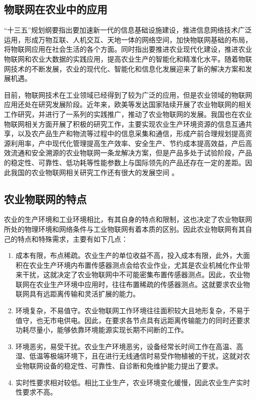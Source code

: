 	\subsection{物联网在农业中的应用}
“十三五”规划纲要指出要加速新一代的信息基础设施建设，推进信息网络技术广泛运用，形成万物互联、人机交互、天地一体的网络空间，加快物联网基础的布局，将物联网应用在社会生活的各个方面。同时指出要推进农业现代化建设，推进农业物联网和农业大数据的实践应用，提高农业生产的智能化和精准化水平。随着物联网技术的不断发展，农业的现代化、智能化和信息化发展迎来了新的解决方案和发展机遇。
	
目前，物联网技术在工业领域已经得到了较为广泛的应用，但是农业领域的物联网应用还处在研究发展阶段。近年来，欧美等发达国家陆续开展了农业物联网的相关工作研究，并进行了一系列的实践推广，推动了农业物联网的发展。我国也在农业物联网相关方面开展了积极的研究工作，主要实现农业生产环境资源的信息互通共享，以及农产品生产和物流等过程中的信息采集和通信，形成产前合理规划提高资源利用率，产中现代化管理提高生产效率、安全生产、节约成本提高效益，产后高效流通和安全溯源的农业物联网一条龙解决方案，但是产品多处于试验阶段，产品的稳定性、可靠性、低功耗等性能参数上与国际领先的产品还存在一定的差距。因此我国的农业物联网相关研究工作还有很大的发展空间\supercite{ChenWei2013} 。
	
	\subsection{农业物联网的特点}
农业的生产环境和工业环境相比，有其自身的特点和限制，这也决定了农业物联网所处的物理环境和网络条件与工业物联网有着本质的区别。因此农业物联网有其自己的特点和特殊需求，主要有如下几点：
	\begin{enumerate}
  			\item 成本有限，布点稀疏。农业生产的单位收益不高，投入成本有限，此外，大面积在农业生产环境内布置传感器测点会给农业作业，尤其是农业机械化作业带来干扰，这就决定了农业物联网中不可能密集布置传感器测点。因此，农业物联网在农业生产环境中应用时，往往布置稀疏的传感器测点。这就要求农业物联网具有远距离传输和灵活扩展的能力。
  			\item 环境复杂，不易值守。农业物联网工作环境往往面积较大且地形复杂，不易于值守，也无市电供电。因此，在要求各节点具有远距离传输能力的同时还要求功耗尽量小，能够依靠环境能源实现长期不间断的工作。
  			\item 环境恶劣，易受干扰。农业生产环境恶劣，设备经常长时间工作在高温、高湿、低温等极端环境下，且在进行无线通信时易受作物植被的干扰，这就对农业物联网设备的稳定性、可靠性、自诊断和免维护能力提出了要求。
  			\item 实时性要求相对较低。相比工业生产，农业环境变化缓慢，因此农业生产实时性要求不高。
	\end{enumerate}


